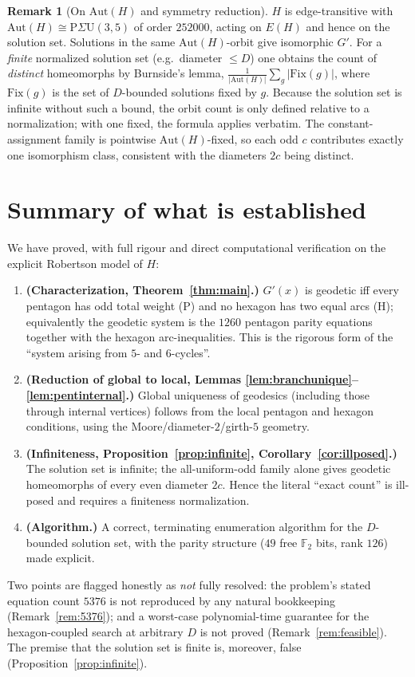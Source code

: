 \documentclass{amsart}
\theoremstyle{definition}
\newtheorem{remark}{Remark}
\begin{document}
\begin{remark}[On $\mathrm{Aut}(H)$ and symmetry reduction]
$H$ is edge-transitive with $\mathrm{Aut}(H)\cong \mathrm{P}\Sigma\mathrm U(3,5)$
of order $252000$, acting on $E(H)$ and hence on the solution set. Solutions in
the same $\mathrm{Aut}(H)$-orbit give isomorphic $G'$. For a \emph{finite}
normalized solution set (e.g.\ diameter $\le D$) one obtains the count of
\emph{distinct} homeomorphs by Burnside's lemma,
$\tfrac{1}{|\mathrm{Aut}(H)|}\sum_{g}|\mathrm{Fix}(g)|$, where
$\mathrm{Fix}(g)$ is the set of $D$-bounded solutions fixed by $g$. Because the
solution set is infinite without such a bound, the orbit count is only defined
relative to a normalization; with one fixed, the formula applies verbatim. The
constant-assignment family is pointwise $\mathrm{Aut}(H)$-fixed, so each odd $c$
contributes exactly one isomorphism class, consistent with the diameters $2c$
being distinct.
\end{remark}

\section{Summary of what is established}

We have proved, with full rigour and direct computational verification on the
explicit Robertson model of $H$:
\begin{enumerate}
\item \textbf{(Characterization, Theorem~\ref{thm:main}.)} $G'(x)$ is geodetic
iff every pentagon has odd total weight (P) and no hexagon has two equal arcs
(H); equivalently the geodetic system is the $1260$ pentagon parity equations
together with the hexagon arc-inequalities. This is the rigorous form of the
``system arising from $5$- and $6$-cycles''.
\item \textbf{(Reduction of global to local, Lemmas
\ref{lem:branchunique}--\ref{lem:pentinternal}.)} Global uniqueness of geodesics
(including those through internal vertices) follows from the local pentagon and
hexagon conditions, using the Moore/diameter-$2$/girth-$5$ geometry.
\item \textbf{(Infiniteness, Proposition~\ref{prop:infinite},
Corollary~\ref{cor:illposed}.)} The solution set is infinite; the all-uniform-odd
family alone gives geodetic homeomorphs of every even diameter $2c$. Hence the
literal ``exact count'' is ill-posed and requires a finiteness normalization.
\item \textbf{(Algorithm.)} A correct, terminating enumeration algorithm for the
$D$-bounded solution set, with the parity structure ($49$ free $\mathbb F_2$
bits, rank $126$) made explicit.
\end{enumerate}
Two points are flagged honestly as \emph{not} fully resolved: the problem's
stated equation count $5376$ is not reproduced by any natural bookkeeping
(Remark~\ref{rem:5376}); and a worst-case polynomial-time guarantee for the
hexagon-coupled search at arbitrary $D$ is not proved (Remark~\ref{rem:feasible}).
The premise that the solution set is finite is, moreover, false
(Proposition~\ref{prop:infinite}).
\end{document}
